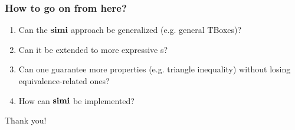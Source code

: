 \documentclass[smaller]{beamer}
\begin{document}
\begin{frame}
  \frametitle{How to go on from here?}
  \begin{enumerate}[<+->]
    \item Can the \(\operatorname{\mathbf{simi}}\) approach be generalized
    (e.g. general TBoxes)?
    \item Can it be extended to
    more expressive \dl{}s?
    \item Can one guarantee more properties
    (e.g. triangle inequality) without losing
    equivalence-related ones?
    \item How can \(\operatorname{\mathbf{simi}}\) be implemented?
  \end{enumerate}
\end{frame}

\begin{frame}[standout]
  Thank you!
\end{frame}
\end{document}
